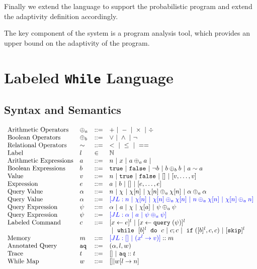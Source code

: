 \documentclass[a4paper,11pt]{article}
\begin{document}
Finally we extend the language to support the probabilistic program and extend the adaptivity definition accordingly.


The key component of the system is a program analysis tool, which provides an upper bound on the adaptivity of the program.

\section{Labeled {\tt While} Language}
\label{sec:while_language}
%
\subsection{Syntax and Semantics}
%
\[
\begin{array}{llll}
 \mbox{Arithmetic Operators} & \oplus_a & ::= & + ~|~ - ~|~ \times 
%
~|~ \div \\  
  \mbox{Boolean Operators} & \oplus_b & ::= & \lor ~|~ \land ~|~ \neg\\
   \mbox{Relational Operators} & \sim & ::= & < ~|~ \leq ~|~ == \\  
   \mbox{Label} & l & \in &  \mathbb{N}  \\  
\mbox{Arithmetic Expressions} & \aexpr & ::= & 
	n ~|~ x ~|~ \aexpr \oplus_a \aexpr ~|~ \\
\mbox{Boolean Expressions} & \bexpr & ::= & 
	\etrue ~|~ \efalse  ~|~ \neg \bexpr
	 ~|~ \bexpr \oplus_b \bexpr
	~|~ \aexpr \sim \aexpr \\
%
\mbox{Value} 
& v & ::= & { n \sep \etrue \sep \efalse ~|~ [] ~|~ [v, \dots, v]}  
\\
%
\mbox{Expression} 
& \expr & ::= & {\aexpr \sep \bexpr ~|~ [] ~|~ [\expr, \dots, \expr]} 
\\
%
\mbox{Query Value} & \qval & ::= 
& { n ~|~ \chi ~|~ \chi[n] ~|~ \chi[n] \oplus_a  \chi[n] ~|~ \qval \oplus_a  \qval }
\\
%
\mbox{Query Value} & \qval & ::= 
& \jl{n ~|~ \chi[n] ~|~ \chi[n] \oplus_a  \chi[n] ~|~ n \oplus_a  \chi[n]
~|~ \chi[n] \oplus_a  n}
\\
%
\mbox{Query Expression} 
& \qexpr & ::= 
& { \qval ~|~ \aexpr ~|~ \chi ~|~ \chi[\aexpr] ~|~ \qexpr \oplus_a \qexpr} 
\\
%
\mbox{Query Expression} 
& \qexpr & ::= 
& \jl{ \qval ~|~ \aexpr ~|~ \qexpr \oplus_a \qexpr} 
\\
\mbox{{Labeled Command}} & c & ::= 
	&   [\assign x \expr]^{l} ~|~  [\assign x \query(\qexpr)]^{l}
	\\
 	& & & ~|~  \ewhile ~ [b]^l ~ \edo ~ c  ~|~ c;c  ~|~ \eif([\bexpr]^l, c, c) 	 ~|~ [\eskip]^{l} 
 \\
\mbox{Memory} 
& m & ::= & \jl{[] ~|~ (x^{l} \to v)} :: m 
\\
%
\mbox{Annotated Query} & \aq  & 
::= & (\qval, l, w)
\\
%
\mbox{Trace} 
& t & ::= & [] ~|~ {\aq :: t}
\\
%
\mbox{While Map}
& w & ::= & {[] |  w[l \to n]}
\end{array}
\]
\end{document}
